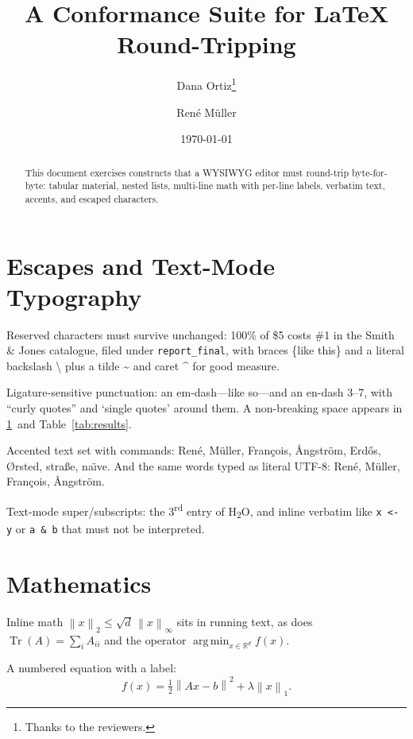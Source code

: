 \documentclass[11pt,twoside]{article}
\title{A Conformance Suite for \LaTeX{} Round-Tripping}
\author{Dana Ortiz\thanks{Thanks to the reviewers.} \and Ren\'{e} M\"{u}ller}
\date{\today}
\DeclareMathOperator{\Tr}{Tr}
\DeclareMathOperator*{\argmin}{arg\,min}
\newcommand{\R}{\mathbb{R}}
\newcommand{\norm}[1]{\left\lVert#1\right\rVert}
\begin{document}
\maketitle

\begin{abstract}
This document exercises constructs that a WYSIWYG editor must round-trip
byte-for-byte: tabular material, nested lists, multi-line math with per-line
labels, verbatim text, accents, and escaped characters.
\end{abstract}

\tableofcontents

\section{Escapes and Text-Mode Typography}
\label{sec:escapes}

Reserved characters must survive unchanged: 100\% of \$5 costs \#1 in the
Smith \& Jones catalogue, filed under \texttt{report\_final}, with braces
\{like this\} and a literal backslash \textbackslash{} plus a tilde
\textasciitilde{} and caret \textasciicircum{} for good measure.

Ligature-sensitive punctuation: an em-dash---like so---and an en-dash 3--7,
with ``curly quotes'' and `single quotes' around them. A non-breaking
space appears in \cref{sec:escapes}~and Table~\ref{tab:results}.

Accented text set with commands: Ren\'{e}, M\"{u}ller, Fran\c{c}ois,
\AA{}ngstr\"{o}m, Erd\H{o}s, \O{}rsted, stra\ss{}e, na\"{\i}ve. And the same
words typed as literal UTF-8: René, Müller, François, Ångström.

Text-mode super/subscripts: the 3\textsuperscript{rd} entry of
H\textsubscript{2}O, and inline verbatim like \verb|x <- y| or
\verb+a & b+ that must not be interpreted.

\section{Mathematics}
\label{sec:math}

Inline math $\norm{x}_2 \le \sqrt{d}\,\norm{x}_\infty$ sits in running text,
as does $\Tr(A) = \sum_i A_{ii}$ and the operator $\argmin_{x \in \R^d} f(x)$.

A numbered equation with a label:
\begin{equation}
  \label{eq:objective}
  f(x) = \tfrac{1}{2}\norm{Ax - b}^2 + \lambda \norm{x}_1 .
\end{equation}
\end{document}

